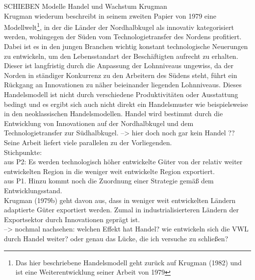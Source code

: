 %
SCHIEBEN Modelle Handel und Wachstum Krugman\\
Krugman wiederum beschreibt in seinem zweiten Papier von 1979 eine Modellwelt\footnote{Das hier beschriebene Handelsmodell geht zurück auf Krugman (1982) und ist eine Weiterentwicklung seiner Arbeit von 1979}, in der die L{\"a}nder der Nordhalbkugel als innovativ kategorisiert werden, wohingegen der S{\"u}den vom Technologietransfer des Nordens profitiert. Dabei ist es in den jungen Branchen wichtig konstant technologische Neuerungen zu entwickeln, um den Lebensstandart der Beschäftigten aufrecht zu erhalten. Dieser ist langfristig durch die Anpassung der Lohnniveaus ungewiss, da der Norden in st{\"a}ndiger Konkurrenz zu den Arbeitern des S{\"u}dens steht, f{\"u}hrt ein R{\"u}ckgang an Innovationen zu n{\"a}her beieinander liegenden Lohnniveaus. Dieses Handelsmodell ist nicht durch verschiedene Produktivit{\"a}ten oder Ausstattung bedingt und es ergibt sich auch nicht direkt ein Handelsmuster wie beispielsweise in den neoklassischen Handelsmodellen.  Handel wird bestimmt durch die Entwicklung von Innovationen auf der Nordhalbkugel und dem Technologietransfer zur S{\"u}dhalbkugel. \textcolor[rgb]{1,0,0}{--> hier doch noch gar kein Handel ??}\\
\textcolor[rgb]{1,0,0}{Seine Arbeit liefert viele parallelen zu der Vorliegenden. \\ Stichpunkte:\\ aus P2: Es werden technologisch h{\"o}her entwickelte G{\"u}ter von der relativ weiter entwickelten Region in die weniger weit entwickelte Region exportiert. \\ aus P1. Hinzu kommt noch die Zuordnung einer Strategie gem{\"a}{\ss} dem Entwicklungsstand. }
\\ Krugman (1979b) geht davon aus, dass in weniger weit entwickelten L{\"a}ndern adaptierte G{\"u}ter exportiert werden. Zumal in industrialisierteren L{\"a}ndern der Exportsektor durch Innovationen gepr{\"a}gt ist. \\ \textcolor[rgb]{1,0,0}{--> nochmal nachsehen: welchen Effekt hat Handel? wie entwickeln sich die VWL durch Handel weiter? oder genau das L{\"u}cke, die ich versuche zu schlie{\ss}en?} \cite{Krugman.1979}
